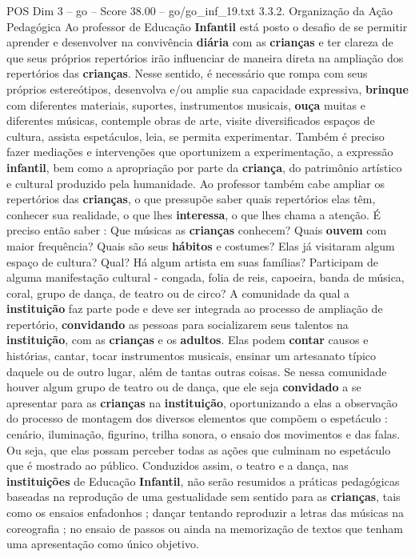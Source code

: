 \begin{textsample}{POS Dim 3 – go – Score 38.00 – go/go\_inf\_19.txt}  \label{ex:f3_pos_045}
3.3.2.
Organização da Ação Pedagógica Ao professor de Educação \textbf{Infantil} está posto o desafio de se permitir aprender e desenvolver na convivência \textbf{diária} com as \textbf{crianças} e ter clareza de que seus próprios repertórios irão influenciar de maneira direta na ampliação dos repertórios das \textbf{crianças}.
Nesse sentido, é necessário que rompa com seus próprios estereótipos, desenvolva e/ou amplie sua capacidade expressiva, \textbf{brinque} com diferentes materiais, suportes, instrumentos musicais, \textbf{ouça} muitas e diferentes músicas, contemple obras de arte, visite diversificados espaços de cultura, assista espetáculos, leia, se permita experimentar.
Também é preciso fazer mediações e intervenções que oportunizem a experimentação, a expressão \textbf{infantil}, bem como a apropriação por parte da \textbf{criança}, do patrimônio artístico e cultural produzido pela humanidade.
Ao professor também cabe ampliar os repertórios das \textbf{crianças}, o que pressupõe saber quais repertórios elas têm, conhecer sua realidade, o que lhes \textbf{interessa}, o que lhes chama a atenção.
É preciso então saber : Que músicas as \textbf{crianças} conhecem?
Quais \textbf{ouvem} com maior frequência?
Quais são seus \textbf{hábitos} e costumes?
Elas já visitaram algum espaço de cultura?
Qual?
Há algum artista em suas famílias?
Participam de alguma manifestação cultural - congada, folia de reis, capoeira, banda de música, coral, grupo de dança, de teatro ou de circo?
A comunidade da qual a \textbf{instituição} faz parte pode e deve ser integrada ao processo de ampliação de repertório, \textbf{convidando} as pessoas para socializarem seus talentos na \textbf{instituição}, com as \textbf{crianças} e os \textbf{adultos}.
Elas podem \textbf{contar} causos e histórias, cantar, tocar instrumentos musicais, ensinar um artesanato típico daquele ou de outro lugar, além de tantas outras coisas.
Se nessa comunidade houver algum grupo de teatro ou de dança, que ele seja \textbf{convidado} a se apresentar para as \textbf{crianças} na \textbf{instituição}, oportunizando a elas a observação do processo de montagem dos diversos elementos que compõem o espetáculo : cenário, iluminação, figurino, trilha sonora, o ensaio dos movimentos e das falas.
Ou seja, que elas possam perceber todas as ações que culminam no espetáculo que é mostrado ao público.
Conduzidos assim, o teatro e a dança, nas \textbf{instituições} de Educação \textbf{Infantil}, não serão resumidos a práticas pedagógicas baseadas na reprodução de uma gestualidade sem sentido para as \textbf{crianças}, tais como os ensaios enfadonhos ; dançar tentando reproduzir a letras das músicas na coreografia ; no ensaio de passos ou ainda na memorização de textos que tenham uma apresentação como único objetivo.

\end{textsample}
